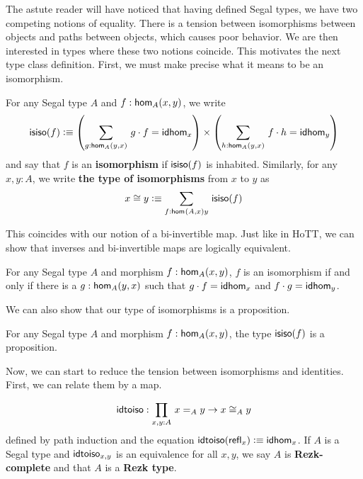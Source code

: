 \documentclass[main.tex]{subfiles}
\begin{document}
The astute reader will have noticed that having defined Segal types, we have two competing notions of equality. There is a tension
between isomorphisms between objects and paths between objects, which causes poor behavior. We are then interested in types where these
two notions coincide. This motivates the next type class definition. First, we must make precise what it means to be an isomorphism.
\begin{definition}
    For any Segal type $A$ and $f : \ho[A]{x}{y}$, we write
    \[
    \iso(f) \defeq \left ( \sm{g :\ho[A]{y}{x}}g \cdot f = \idhom{x} \right ) \times \left ( \sm{h : \ho[A]{y}{x}} f \cdot h = \idhom{y} \right )
    \]
    and say that $f$ is an \textbf{isomorphism} if $\iso(f)$ is inhabited. Similarly, for any $x,y : A$, we write \textbf{the type of isomorphisms}
    from $x$ to $y$ as 
    \[
    x \cong y \defeq \sm{f : \ho{A}{x}{y}}\iso(f)
    \]
\end{definition}
This coincides with our notion of a bi-invertible map. Just like in HoTT, we can show that inverses and bi-invertible maps are logically
equivalent.

\begin{lemma}
    For any Segal type $A$ and morphism $f : \ho[A]{x}{y}$, $f$ is an isomorphism if and only if there is a $g : \ho[A]{y}{x}$ such that 
    $g \cdot f = \idhom{x}$ and $f \cdot g = \idhom{y}$.
\end{lemma}
We can also show that our type of isomorphisms is a proposition.
\begin{lemma}
    For any Segal type $A$ and morphism $f : \ho[A]{x}{y}$, the type $\iso(f)$ is a proposition.
\end{lemma}
Now, we can start to reduce the tension between isomorphisms and identities. First, we can relate them by a map.
\begin{lemma}
    \begin{equation}
        \idi : \prd{x,y:A}x =_A y \to x \cong_A y
    \end{equation}
    defined by path induction and the equation $\idi(\refl{x}) \defeq \idhom{x}$. If $A$ is a Segal type and 
    $\idi_{x,y}$ is an equivalence for all $x,y$, we say $A$ is \textbf{Rezk-complete} and that $A$ is a \textbf{Rezk type}.
\end{lemma}
\end{document}

